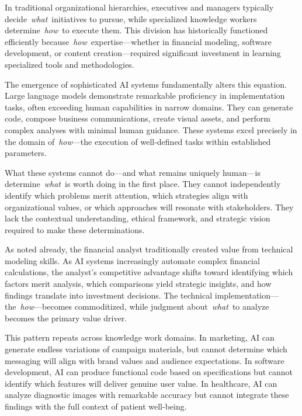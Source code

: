 \documentclass[
  Letterpaper,
]{scrbook}
\begin{document}
In traditional organizational hierarchies, executives and managers
typically decide~\emph{what}~initiatives to pursue, while specialized
knowledge workers determine~\emph{how}~to execute them. This division
has historically functioned efficiently
because~\emph{how}~expertise---whether in financial modeling, software
development, or content creation---required
significant investment in learning specialized tools and methodologies.

The emergence of sophisticated AI systems fundamentally alters this
equation. Large language models demonstrate remarkable proficiency in
implementation tasks, often exceeding human capabilities in narrow
domains. They can generate code, compose business communications, create
visual assets, and perform complex analyses with minimal human guidance.
These systems excel precisely in the domain of~\emph{how}---the
execution of well-defined tasks within established parameters.

What these systems cannot do---and what remains uniquely human---is
determine~\emph{what}~is worth doing in the first place. They cannot
independently identify which problems merit attention, which strategies
align with organizational values, or which approaches will resonate with
stakeholders. They lack the contextual
understanding,
ethical framework, and strategic vision required to make these
determinations.

As noted already, the financial analyst traditionally created value from
technical modeling skills. As AI systems increasingly automate complex
financial calculations, the analyst's competitive advantage shifts
toward identifying which factors merit analysis, which comparisons yield
strategic insights, and how findings translate into investment
decisions. The technical implementation---the~\emph{how}---becomes
commoditized, while judgment about~\emph{what}~to analyze becomes the
primary value driver.

This pattern repeats across knowledge work domains. In
marketing, AI can generate endless variations of
campaign materials, but cannot determine which messaging will align with
brand values and audience expectations. In software development, AI can
produce functional code based on specifications but cannot identify
which features will deliver genuine user value. In healthcare, AI can
analyze diagnostic images with remarkable accuracy but cannot integrate
these findings with the full context of patient well-being.
\end{document}
